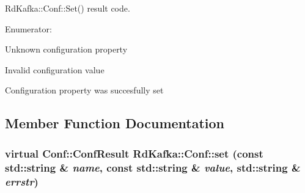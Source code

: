 RdKafka::Conf::Set() result code. \begin{Desc}
\item[Enumerator: ]\par
\begin{description}
\item[{\em 
\hypertarget{classRdKafka_1_1Conf_a1d023a689c09f42ab18b7bd1d15a11a6acadd966f4a2fc7af06c40c5797d6c770}{
CONF\_\-UNKNOWN}
\label{classRdKafka_1_1Conf_a1d023a689c09f42ab18b7bd1d15a11a6acadd966f4a2fc7af06c40c5797d6c770}
}]Unknown configuration property \item[{\em 
\hypertarget{classRdKafka_1_1Conf_a1d023a689c09f42ab18b7bd1d15a11a6a52341920e079d64196690c9716185cf4}{
CONF\_\-INVALID}
\label{classRdKafka_1_1Conf_a1d023a689c09f42ab18b7bd1d15a11a6a52341920e079d64196690c9716185cf4}
}]Invalid configuration value \item[{\em 
\hypertarget{classRdKafka_1_1Conf_a1d023a689c09f42ab18b7bd1d15a11a6a24a2953f4b85e58c6915031fd7c4f52f}{
CONF\_\-OK}
\label{classRdKafka_1_1Conf_a1d023a689c09f42ab18b7bd1d15a11a6a24a2953f4b85e58c6915031fd7c4f52f}
}]Configuration property was succesfully set \end{description}
\end{Desc}



\subsection{Member Function Documentation}
\hypertarget{classRdKafka_1_1Conf_ac122170f07773c5228916a3392929f20}{
\subsubsection[{set}]{\setlength{\rightskip}{0pt plus 5cm}virtual {\bf Conf::ConfResult} RdKafka::Conf::set (const std::string \& {\em name}, \/  const std::string \& {\em value}, \/  std::string \& {\em errstr})}}
\label{classRdKafka_1_1Conf_ac122170f07773c5228916a3392929f20}


